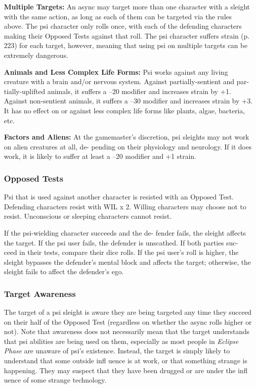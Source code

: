 \textbf{Multiple Targets:} An async may target more than 
one character with a sleight with the same action, as 
long as each of them can be targeted via the rules 
above. The psi character only rolls once, with each of 
the defending characters making their Opposed Tests 
against that roll. The psi character suffers strain (p. 
223) for each target, however, meaning that using psi 
on multiple targets can be extremely dangerous.

\textbf{Animals and Less Complex Life Forms:} Psi works 
against any living creature with a brain and/or 
nervous system. Against partially-sentient and par-
tially-uplifted animals, it suffers a –20 modifier and 
increases strain by +1. Against non-sentient animals, 
it suffers a –30 modifier and increases strain by +3. It 
has no effect on or against less complex life forms like 
plants, algae, bacteria, etc.

\textbf{Factors and Aliens:} At the gamemaster's discretion, 
psi sleights may not work on alien creatures at all, de-
pending on their physiology and neurology. If it does 
work, it is likely to suffer at least a –20 modifier and 
+1 strain.

\subsubsection{Opposed Tests}

Psi that is used against another character is resisted 
with an Opposed Test. Defending characters resist with 
WIL x 2. Willing characters may choose not to resist. 
Unconscious or sleeping characters cannot resist.

If the psi-wielding character succeeds and the de-
fender fails, the sleight affects the target. If the psi user 
fails, the defender is unscathed. If both parties suc-
ceed in their tests, compare their dice rolls. If the psi 
user's roll is higher, the sleight bypasses the defender's 
mental block and affects the target; otherwise, the 
sleight fails to affect the defender's ego.

\subsubsection{Target Awareness}

The target of a psi sleight is aware they are being 
targeted any time they succeed on their half of the 
Opposed Test (regardless on whether the async 
rolls higher or not). Note that awareness does not 
necessarily mean that the target understands that psi 
abilities are being used on them, especially as most 
people in \textit{Eclipse Phase} are unaware of psi's existence. 
Instead, the target is simply likely to understand that 
some outside infl uence is at work, or that something 
strange is happening. They may suspect that they 
have been drugged or are under the infl uence of some 
strange technology.

